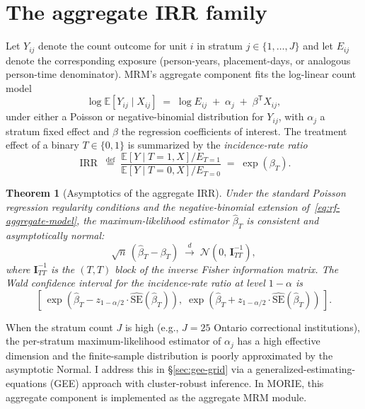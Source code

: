 \documentclass[11pt,a4paper]{article}
\theoremstyle{plain}
\newtheorem{theorem}{Theorem}[section]
\theoremstyle{definition}
\theoremstyle{remark}
\newcommand{\E}{\mathbb{E}}
\newcommand{\eqdef}{\mathrel{\stackrel{\mathrm{def}}{=}}}
\newcommand{\T}{\mathsf{T}}
\DeclareMathOperator{\IRR}{IRR}
\begin{document}
\section{The aggregate IRR family}
\label{sec:mrm-aggregate}

Let $Y_{ij}$ denote the count outcome for unit $i$ in stratum
$j \in \{1, \ldots, J\}$ and let $E_{ij}$ denote the corresponding
exposure (person-years, placement-days, or analogous person-time
denominator). MRM's aggregate component fits the log-linear
count model
\begin{equation}
  \log \E[Y_{ij} \mid X_{ij}] \;=\; \log E_{ij}
   \;+\; \alpha_{j} \;+\; \beta^{\T} X_{ij},
  \label{eq:rf-aggregate-model}
\end{equation}
under either a Poisson or negative-binomial distribution for
$Y_{ij}$, with $\alpha_{j}$ a stratum fixed effect and $\beta$ the
regression coefficients of interest. The treatment effect of a
binary $T \in \{0,1\}$ is summarized by the
\emph{incidence-rate ratio}
\begin{equation}
  \IRR \;\eqdef\;
   \frac{\E[Y \mid T=1, X]/E_{T=1}}
        {\E[Y \mid T=0, X]/E_{T=0}}
   \;=\; \exp(\beta_{T}).
  \label{eq:irr}
\end{equation}

\begin{theorem}[Asymptotics of the aggregate IRR]
\label{thm:rf-irr-asymptotics}
Under the standard Poisson regression regularity conditions and
the negative-binomial extension of~\eqref{eq:rf-aggregate-model},
the maximum-likelihood estimator $\hat{\beta}_{T}$ is consistent
and asymptotically normal:
\begin{equation*}
  \sqrt{n}\,(\hat{\beta}_{T} - \beta_{T})
   \;\xrightarrow{d}\; \mathcal{N}\!\left(0,\, \mathbf{I}^{-1}_{TT}\right),
\end{equation*}
where $\mathbf{I}^{-1}_{TT}$ is the $(T,T)$ block of the inverse
Fisher information matrix. The Wald confidence interval for the
incidence-rate ratio at level $1 - \alpha$ is
\begin{equation}
  \left[\,
  \exp\!\left(\hat{\beta}_{T} - z_{1 - \alpha/2}
              \cdot \widehat{\mathrm{SE}}(\hat{\beta}_{T})\right),
  \;
  \exp\!\left(\hat{\beta}_{T} + z_{1 - \alpha/2}
              \cdot \widehat{\mathrm{SE}}(\hat{\beta}_{T})\right)
  \,\right].
  \label{eq:irr-ci}
\end{equation}
\end{theorem}

When the stratum count $J$ is high (e.g., $J = 25$ Ontario
correctional institutions), the per-stratum maximum-likelihood
estimator of $\alpha_{j}$ has a high effective dimension and the
finite-sample distribution is poorly approximated by the
asymptotic Normal. I address this in \S\ref{sec:gee-grid} via a
generalized-estimating-equations (GEE) approach with cluster-robust
inference. In MORIE, this aggregate component is implemented as
the aggregate MRM module.
\end{document}
